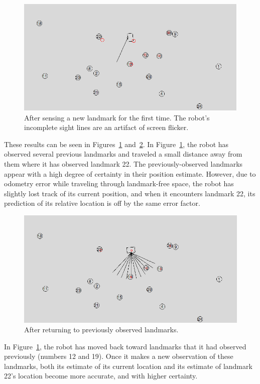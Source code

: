 \documentclass[prodmode,acmtecs]{acmsmall} %
\begin{document}
\begin{figure}[h!]
\includegraphics[width=\textwidth]{update1.png}
\caption{After sensing a new landmark for the first time.  The robot's incomplete sight lines are an artifact of screen flicker.}
\label{fig:update1}
\end{figure}

These results can be seen in Figures~\ref{fig:update1} and~\ref{fig:update2}.  In Figure~\ref{fig:update1}, the robot has observed several previous landmarks and traveled a small distance away from them where it has observed landmark 22.  The previously-observed landmarks appear with a high degree of certainty in their position estimate.  However, due to odometry error while traveling through landmark-free space, the robot has slightly lost track of its current position, and when it encounters landmark 22, its prediction of its relative location is off by the same error factor.

\begin{figure}[h!]
\includegraphics[width=\textwidth]{update2.png}
\caption{After returning to previously observed landmarks.}
\label{fig:update2}
\end{figure}

In Figure~\ref{fig:update1}, the robot has moved back toward landmarks that it had observed previously (numbers 12 and 19).  Once it makes a new observation of these landmarks, both its estimate of its current location and its estimate of landmark 22's location become more accurate, and with higher certainty.
\end{document}
